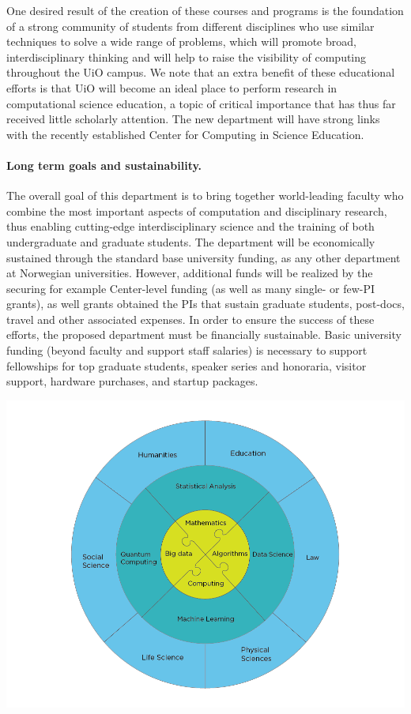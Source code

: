 \documentclass[oneside,final,10pt]{article}
\begin{document}
One desired result of the creation of these
courses and programs is the foundation of a strong community of students from different
disciplines who use similar techniques to solve a wide range of problems, which will promote
broad, interdisciplinary thinking and will help to raise the visibility of computing throughout the UiO campus. We note that an extra benefit of these educational
efforts is that UiO will become an ideal place to perform research in computational science
education, a topic of critical importance that has thus far received little scholarly attention. The new department will have strong links with the recently established Center for Computing in Science Education. 




\paragraph{Long term goals and sustainability.}
The overall goal of this department is to bring together world-leading
faculty who combine the most important aspects of computation and
disciplinary research, thus enabling cutting-edge interdisciplinary
science and the training of both undergraduate and graduate
students. The department will be economically sustained through the standard base
university funding, as any other department at Norwegian universities. 
However, additional funds will be
realized by the securing for example Center-level funding (as well as many
single- or few-PI grants), as well grants obtained the PIs that sustain graduate
students, post-docs, travel and other associated expenses.  In order
to ensure the success of these efforts, the proposed department must
be financially sustainable. Basic university funding (beyond faculty
and support staff salaries) is necessary to support fellowships for
top graduate students, speaker series and honoraria, visitor support,
hardware purchases, and startup packages.


\centerline{\includegraphics[width=1.0\linewidth]{topics.png}}
\end{document}
